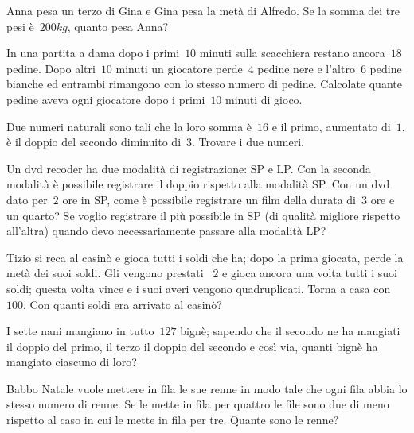 \begin{multicols}{2}
\begin{esercizio}[\Ast]
\label{ese:16.59}
Anna pesa un terzo di Gina e Gina pesa la metà di Alfredo. Se la somma dei tre pesi è~$200\unit{kg}$, quanto pesa Anna?
\end{esercizio}

\begin{esercizio}
\label{ese:16.60}
In una partita a dama dopo i primi~$10$ minuti sulla scacchiera restano ancora~$18$ pedine. Dopo altri~$10$ minuti un giocatore perde~$4$ pedine nere e l'altro~$6$ pedine bianche ed entrambi rimangono con lo stesso numero di pedine. Calcolate quante pedine aveva ogni giocatore dopo i primi~$10$ minuti di gioco.
\end{esercizio}

\begin{esercizio}[\Ast]
\label{ese:16.61}
Due numeri naturali sono tali che la loro somma è~$16$ e il primo, aumentato di~$1$, è il doppio del secondo diminuito di~$3$. Trovare i due numeri.
\end{esercizio}

\begin{esercizio}
\label{ese:16.62}
Un dvd recoder ha due modalità di registrazione: SP e LP. Con la seconda modalità è possibile registrare il doppio rispetto alla modalità SP. Con un dvd dato per~$2$ ore in SP, come è possibile registrare un film della durata di~$3$ ore e un quarto? Se voglio registrare il più possibile in SP (di qualità migliore rispetto all'altra) quando devo necessariamente passare alla modalità LP?
\end{esercizio}

\begin{esercizio}[\Ast]
\label{ese:16.63}
Tizio si reca al casinò e gioca tutti i soldi che ha; dopo la prima giocata, perde la metà dei suoi soldi. Gli vengono prestati \officialeuro~$2$ e gioca ancora una volta tutti i suoi soldi; questa volta vince e i suoi averi vengono quadruplicati. Torna a casa con \officialeuro~$100$. Con quanti soldi era arrivato al casinò?
\end{esercizio}

\begin{esercizio}[\Ast]
\label{ese:16.64}
I sette nani mangiano in tutto~$127$ bignè; sapendo che il secondo ne ha mangiati il doppio del primo, il terzo il doppio del secondo e così via, quanti bignè ha mangiato ciascuno di loro?
\end{esercizio}

\begin{esercizio}[\Ast]
\label{ese:16.65}
Babbo Natale vuole mettere in fila le sue renne in modo tale che ogni fila abbia lo stesso numero di renne. Se le mette in fila per quattro le file sono due di meno rispetto al caso in cui le mette in fila per tre. Quante sono le renne?
\end{esercizio}


\end{multicols}
